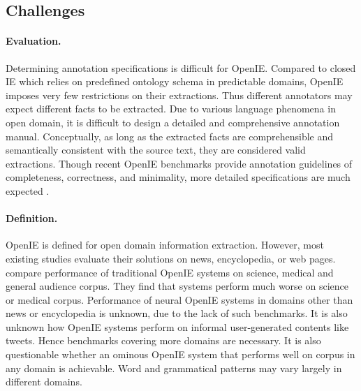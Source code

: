 \documentclass{article}
\begin{document}
\subsection{Challenges}
\label{sec:challenge}
\paragraph{Evaluation.}
Determining annotation specifications is difficult for OpenIE. 
Compared to closed IE which relies on predefined ontology schema in predictable domains, OpenIE imposes very few restrictions on their extractions. Thus different annotators may expect different facts to be extracted.
Due to various language phenomena in open domain, it is difficult to design a detailed and comprehensive annotation manual.
Conceptually, as long as the extracted facts are comprehensible and semantically consistent with the source text, they are considered valid extractions. 
Though recent OpenIE benchmarks provide annotation guidelines of completeness, correctness, and minimality, more detailed specifications are much expected \cite{lechelle-etal-2019-wire57}.

\paragraph{Definition.}
OpenIE is defined for open domain information extraction. However, most existing studies evaluate their solutions on news, encyclopedia, or web pages. \citeauthor{groth-etal-2018-open}~\citeyear{groth-etal-2018-open} compare  performance of traditional OpenIE systems on science, medical and general audience corpus. They find that systems perform much worse on science or medical corpus. Performance of neural OpenIE systems in domains other than news or encyclopedia is unknown, due to the lack of such benchmarks. It is also unknown how OpenIE systems perform on informal user-generated contents like tweets. Hence benchmarks covering more domains are necessary. It is also questionable whether an ominous OpenIE system that performs well on corpus in any domain is achievable. Word and grammatical patterns may vary largely in different domains.
\end{document}
